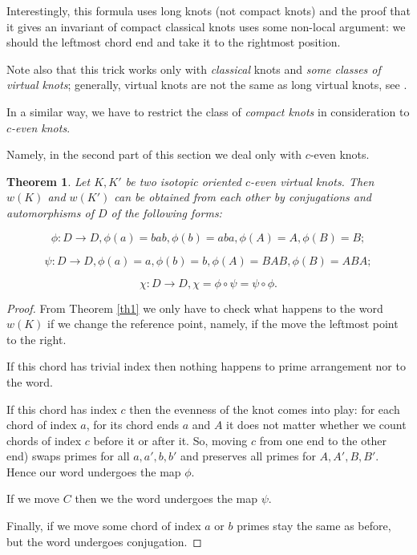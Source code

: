 \documentclass[12pt]{article}
\newtheorem{thm}{Theorem}
\theoremstyle{definition}
\theoremstyle{remark}
\begin{document}
Interestingly, this formula uses long knots (not compact knots) and the proof that it gives an invariant
of compact classical knots uses some non-local argument: we should the leftmost chord end and take it
to the rightmost position.

Note also that this trick works only with {\em classical} knots and {\em some classes of virtual knots};
generally, virtual knots are not the same as long virtual knots, see \cite{Long}. 




In a similar way, we have to restrict the class of {\em compact knots} in consideration to {\em $c$-even knots}.

Namely, in the second part of this section we deal only with $c$-even knots.

\begin{thm}
Let $K,K'$ be two isotopic oriented $c$-even virtual knots. Then $w(K)$ and $w(K')$ can be obtained from
each other by 
conjugations and automorphisms of $D$ of the following forms:

$$\phi: D\to D, \phi(a)=bab,\phi(b)=aba, \phi(A)=A,\phi(B)=B;$$

$$\psi: D\to D, \phi(a)=a,\phi(b)=b, \phi(A)=BAB,\phi(B)=ABA;$$

$$\chi: D\to D, \chi=\phi\circ\psi=\psi\circ \phi.$$
\end{thm}

\begin{proof}
From Theorem \ref{th1} we only have to check what happens to the word $w(K)$ if we change the
reference point, namely, if the move the leftmost point to the right.

If this chord has trivial index then nothing happens to prime arrangement nor to the word.

If this chord has index $c$ then the evenness of the knot comes into play:
for each chord of index $a$, for its chord ends $a$ and $A$ it does not matter
whether we count chords of index $c$ before it or after it. 
So, moving $c$ from one end to the other end) swaps primes for all
$a,a',b,b'$ and preserves all primes for $A,A',B,B'$. Hence our word undergoes the map $\phi$.

If we move $C$ then we the word undergoes the map $\psi$.

Finally, if we move some chord of index $a$ or $b$ primes stay the
same as before, but the word undergoes conjugation.


\end{proof}
\end{document}
